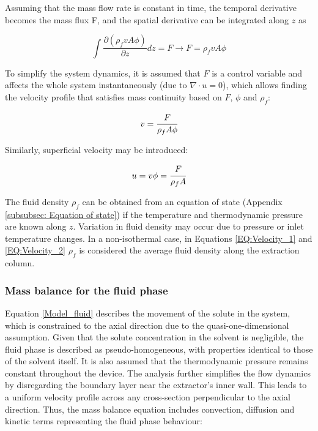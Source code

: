 \documentclass[a4paper,fleqn]{cas-dc}
\begin{document}
Assuming that the mass flow rate is constant in time, the temporal derivative becomes the mass flux F, and the spatial derivative can be integrated along $z$ as

{\footnotesize
	\begin{equation}
		\int \frac{\partial (\rho_f v A \phi )}{\partial z} dz = F \rightarrow F=\rho_f v A\phi
	\end{equation}
}

To simplify the system dynamics, it is assumed that $F$ is a control variable and affects the whole system instantaneously (due to $\nabla \cdot u = 0$), which allows finding the velocity profile that satisfies mass continuity based on $F$, $\phi$ and $\rho_f$:

{\footnotesize
	\begin{equation} \label{EQ:Velocity_1}
		v = \cfrac{F}{\rho_f A\phi} 
	\end{equation}
}

Similarly, superficial velocity may be introduced:

{\footnotesize
	\begin{equation} \label{EQ:Velocity_2}
		u = v \phi = \cfrac{F}{\rho_f A }
	\end{equation}
}

The fluid density $\rho_f$ can be obtained from an equation of state (Appendix \ref{subsubsec: Equation of state}) if the temperature and thermodynamic pressure are known along $z$. Variation in fluid density may occur due to pressure or inlet temperature changes. In a non-isothermal case, in Equations \ref{EQ:Velocity_1} and \ref{EQ:Velocity_2} $\rho_f$ is considered the average fluid density along the extraction column.

\subsubsection{Mass balance for the fluid phase} \label{CH: Mass_balance_fluid}

Equation \ref{Model_fluid} describes the movement of the solute in the system, which is constrained to the axial direction due to the quasi-one-dimensional assumption. Given that the solute concentration in the solvent is negligible, the fluid phase is described as pseudo-homogeneous, with properties identical to those of the solvent itself. It is also assumed that the thermodynamic pressure remains constant throughout the device. The analysis further simplifies the flow dynamics by disregarding the boundary layer near the extractor's inner wall. This leads to a uniform velocity profile across any cross-section perpendicular to the axial direction. Thus, the mass balance equation includes convection, diffusion and kinetic terms representing the fluid phase behaviour:
\end{document}
